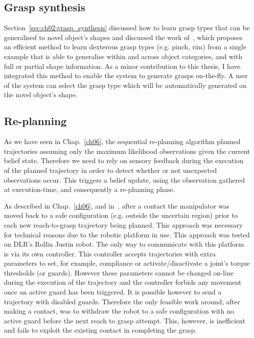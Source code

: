 \subsection{Grasp synthesis}\label{sec:ch07:grasp_synthesis}

Section~\ref{sec:ch02:grasp_synthesis} discussed how to learn grasp types that can be generalised to novel object's shapes and discussed the work of~\citep{bib:kopicki_2014, bib:kopicki_2015}, which proposes an efficient method to learn dexterous grasp types (e.g. pinch, rim) from a single example that is able to generalise within and across object categories, and with full or partial shape information. As a minor contribution to this thesis, I have integrated this method to enable the system to generate grasps on-the-fly. A user of the system can select the grasp type which will be automatically generated on the novel object's shape.

\subsection{Re-planning}\label{sec:07:replan}

As we have seen in Chap.~\ref{ch06}, the sequential re-planning algorithm planned trajectories assuming only the maximum likelihood observations given the current belief state. Therefore we need to rely on sensory feedback during the execution of the planned trajectory in order to detect whether or not unexpected observations occur. This triggers a belief update, using the observation gathered at execution-time, and consequently a re-planning phase. 

As described in Chap.~\ref{ch06}, and in~\citep{bib:zito_workshop_iros2012, bib:zito_iros_2013}, after a contact the manipulator was moved back to a safe configuration (e.g. outside the uncertain region) prior to each new reach-to-grasp trajectory being planned. This approach was necessary for technical reasons due to the robotic platform in use. This approach was tested on DLR's Rollin Justin robot. The only way to communicate with this platform is via its own controller. This controller accepts trajectories with extra parameters to set, for example, compliance or activate/disactivate a joint's torque thresholds (or guards). However these parameters cannot be changed on-line during the execution of the trajectory and the controller forbids any movement once an active guard has been triggered. It is possible however to send a trajectory with disabled guards. Therefore the only feasible work around, after making a contact, was to withdraw the robot to a safe configuration with no active guard before the next reach to grasp attempt. This, however, is inefficient and fails to exploit the existing contact in completing the grasp.

